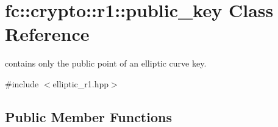 \hypertarget{classfc_1_1crypto_1_1r1_1_1public__key}{}\section{fc\+:\+:crypto\+:\+:r1\+:\+:public\+\_\+key Class Reference}
\label{classfc_1_1crypto_1_1r1_1_1public__key}


contains only the public point of an elliptic curve key.  




{\ttfamily \#include $<$elliptic\+\_\+r1.\+hpp$>$}

\subsection*{Public Member Functions}

